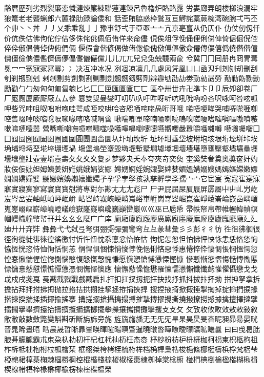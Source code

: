 齢暦歴列劣烈裂廉恋憐漣煉簾練聯蓮連錬呂魯櫓炉賂路露
労婁廊弄朗楼榔浪漏牢狼篭⽼老聾蝋郎六麓禄肋録論倭和
話歪賄脇惑枠鷲亙亘鰐詫藁蕨椀湾碗腕弌丐丕个丱⼂丶丼
⼃丿乂乖乘亂⼅亅豫亊舒弍于亞亟⼇亠亢亰亳亶从仍仄仆
仂仗仞仭仟价伉佚估佛佝佗佇佶侈侏侘佻佩佰侑佯來侖儘
俔俟俎俘俛俑俚俐俤俥倚倨倔倪倥倅伜俶倡倩倬俾俯們倆
偃假會偕偐偈做偖偬偸傀傚傅傴傲僉僊傳僂僖僞僥僭僣僮
價僵儉儁儂儖儕儔儚儡儺儷儼儻⼉儿⺎兀兒兌兔兢竸兩兪
兮冀⼌冂囘册冉冏冑冓冕⼍冖冤冦冢冩冪⼎冫决冱冲冰况
冽凅凉凛⼏几處凩凭凰⼐凵凾刄刋刔刎刧刪刮刳刹剏剄剋
剌剞剔剪剴剩剳剿剽劍劔劒剱劈劑辨辧劬劭劼劵勁勍勗勞
勣勦飭勠勳勵勸⼓勹匆匈甸匍匐匏匕⼔匚⼕匣匯匱匳⼖匸
區卆卅丗卉卍凖卞⼙卩卮夘卻卷⼚厂厖厠厦厥厮厰⼛厶參
簒雙叟曼燮叮叨叭叺吁吽呀听吭吼吮吶吩吝呎咏呵咎呟呱
呷呰咒呻咀呶咄咐咆哇咢咸咥咬哄哈咨咫哂咤咾咼哘哥哦
唏唔哽哮哭哺哢唹啀啣啌售啜啅啖啗唸唳啝喙喀咯喊喟啻
啾喘喞單啼喃喩喇喨嗚嗅嗟嗄嗜嗤嗔嘔嗷嘖嗾嗽嘛嗹噎噐
營嘴嘶嘲嘸噫噤嘯噬噪嚆嚀嚊嚠嚔嚏嚥嚮嚶嚴囂嚼囁囃囀
囈囎囑囓⼞囗囮囹圀囿圄圉圈國圍圓團圖嗇圜圦圷圸坎圻
址坏坩埀垈坡坿垉垓垠垳垤垪垰埃埆埔埒埓堊埖埣堋堙堝
塲堡塢塋塰毀塒堽塹墅墹墟墫墺壞墻墸墮壅壓壑壗壙壘壥
壜壤壟壯壺壹壻壼壽夂⼡夊⼢夐夛梦夥夬夭夲夸夾竒奕奐
奎奚奘奢奠奧奬奩奸妁妝佞侫妣妲姆姨姜妍姙姚娥娟娑娜
娉娚婀婬婉娵娶婢婪媚媼媾嫋嫂媽嫣嫗嫦嫩嫖嫺嫻嬌嬋嬖
嬲嫐嬪嬶嬾孃孅孀孑孕孚孛孥孩孰孳孵學斈孺⼧宀它宦宸
寃寇寉寔寐寤實寢寞寥寫寰寶寳尅將專對尓尠⺐⼪尢尨⼫
尸尹屁屆屎屓屐屏孱屬⼬屮乢屶屹岌岑岔妛岫岻岶岼岷峅
岾峇峙峩峽峺峭嶌峪崋崕崗嵜崟崛崑崔崢崚崙崘嵌嵒嵎嵋
嵬嵳嵶嶇嶄嶂嶢嶝嶬嶮嶽嶐嶷嶼巉巍巓巒巖⼮巛巫已巵帋
帚帙帑帛帶帷幄幃幀幎幗幔幟幢幤幇幵并⺓⼳幺麼⼴广庠
廁廂廈廐廏廖廣廝廚廛廢廡廨廩廬廱廳廰⼵廴廸⼶廾弃弉
彝彜⼷弋弑弖弩弭弸彁彈彌彎弯⺔彑彖彗彙⼺彡彭⼻彳彷
徃徂彿徊很徑徇從徙徘徠徨徭徼忖忻忤忸忱忝悳忿怡恠怙
怐怩怎怱怛怕怫怦怏怺恚恁恪恷恟恊恆恍恣恃恤恂恬恫恙
悁悍惧悃悚悄悛悖悗悒悧悋惡悸惠惓悴忰悽惆悵惘慍愕愆
惶惷愀惴惺愃愡惻惱愍愎慇愾愨愧慊愿愼愬愴愽慂慄慳慷
慘慙慚慫慴慯慥慱慟慝慓慵憙憖憇憬憔憚憊憑憫憮懌懊應
懷懈懃懆憺懋罹懍懦懣懶懺懴懿懽懼懾戀⼽戈戉戍戌戔戛
戞戡截戮戰戲戳扁扎扞扣扛扠扨扼抂抉找抒抓抖拔抃抔拗
拑抻拏拿拆擔拈拜拌拊拂拇抛拉挌拮拱挧挂挈拯拵捐挾捍
搜捏掖掎掀掫捶掣掏掉掟掵捫捩掾揩揀揆揣揉插揶揄搖搴
搆搓搦搶攝搗搨搏摧摯摶摎攪撕撓撥撩撈撼據擒擅擇撻擘
擂擱擧舉擠擡抬擣擯攬擶擴擲擺攀擽攘攜攅攤攣攫⽁攴⺙
攵攷收攸畋效敖敕敍敘敞敝敲數斂斃變斛斟斫斷旃旆旁旄
旌旒旛旙⽆无⺛旡旱杲昊昃旻杳昵昶昴昜晏晄晉晁晞晝晤
晧晨晟晢晰暃暈暎暉暄暘暝曁暹曉暾暼曄暸曖曚曠昿曦曩
⽈曰曵曷朏朖朞朦朧霸朮朿朶杁朸朷杆杞杠杙杣杤枉杰枩
杼杪枌枋枦枡枅枷柯枴柬枳柩枸柤柞柝柢柮枹柎柆柧檜栞
框栩桀桍栲桎梳栫桙档桷桿梟梏梭梔條梛梃檮梹桴梵梠梺
椏梍桾椁棊椈棘椢椦棡椌棍棔棧棕椶椒椄棗棣椥棹棠棯椨
椪椚椣椡棆楹楷楜楸楫楔楾楮椹楴椽楙椰楡楞楝榁楪榲榮

